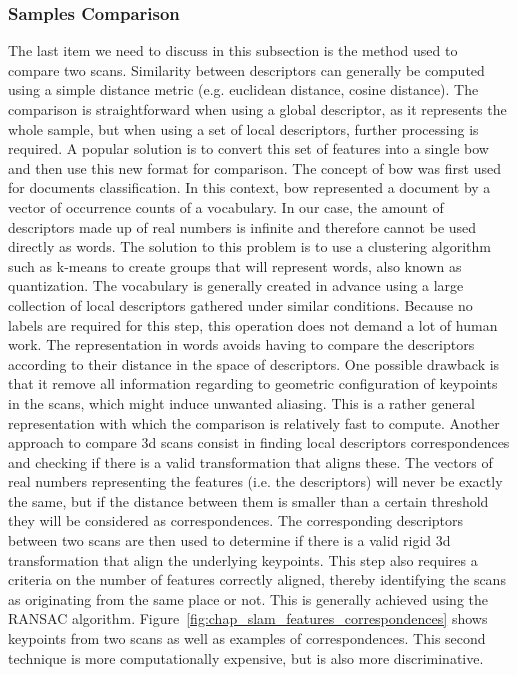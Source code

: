 \subsubsection{Samples Comparison}
\label{ssub:scans_comparison}

The last item we need to discuss in this subsection is the method used to compare two scans. Similarity between descriptors can generally be computed using a simple distance metric (e.g. euclidean distance, cosine distance). The comparison is straightforward when using a global descriptor, as it represents the whole sample, but when using a set of local descriptors, further processing is required. A popular solution is to convert this set of features into a single \gls*{bow} and then use this new format for comparison. The concept of \gls*{bow} was first used for documents classification. In this context, \gls*{bow} represented a document by a vector of occurrence counts of a vocabulary. In our case, the amount of descriptors made up of real numbers is infinite and therefore cannot be used directly as words. The solution to this problem is to use a clustering algorithm such as k-means to create groups that will represent words, also known as quantization. The vocabulary is generally created in advance using a large collection of local descriptors gathered under similar conditions. Because no labels are required for this step, this operation does not demand a lot of human work. The representation in words avoids having to compare the descriptors according to their distance in the space of descriptors. One possible drawback is that it remove all information regarding to geometric configuration of keypoints in the scans, which might induce unwanted aliasing. This is a rather general representation with which the comparison is relatively fast to compute. Another approach to compare \gls*{3d} scans consist in finding local descriptors correspondences and checking if there is a valid transformation that aligns these. The vectors of real numbers representing the features (i.e. the descriptors) will never be exactly the same, but if the distance between them is smaller than a certain threshold they will be considered as correspondences. The corresponding descriptors between two scans are then used to determine if there is a valid rigid \gls*{3d} transformation that align the underlying keypoints. This step also requires a criteria on the number of features correctly aligned, thereby identifying the scans as originating from the same place or not. This is generally achieved using the RANSAC algorithm. Figure~\ref{fig:chap_slam_features_correspondences} shows keypoints from two scans as well as examples of correspondences. This second technique is more computationally expensive, but is also more discriminative.

